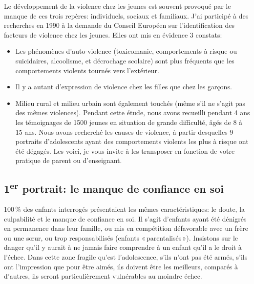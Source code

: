 \documentclass[11pt]{article} %
\begin{document}
  Le développement de la violence chez les jeunes est souvent provoqué par le manque de ces trois repères: individuels, sociaux et familiaux.\newline
  J'ai participé à des recherches en 1990 à la demande du Conseil Européen sur l'identification des facteurs de violence chez les jeunes. Elles ont mis en évidence 3 constats:
  \begin{itemize}[--]

    \item Les phénomènes d'auto-violence (toxicomanie, comportements à risque ou suicidaires, alcoolisme, et décrochage scolaire) sont plus fréquents que les comportements violents tournés vers l'extérieur.

    \item Il y a autant d'expression de violence chez les filles que chez les garçons.

    \item Milieu rural et milieu urbain sont également touchés (même s'il ne s'agit pas des mêmes violences). Pendant cette étude, nous avons recueilli pendant 4 ans les témoignages de 1500 jeunes en situation de grande difficulté, âgés de 8 à 15 ans. Nous avons recherché les causes de violence, à partir desquelles 9 portraits d'adolescents ayant des comportements violents les plus à risque ont été dégagés. Les voici, je vous invite à les transposer en fonction de votre pratique de parent ou d'enseignant.
  \end{itemize}

\subsection{1\textsuperscript{er} portrait: le manque de confiance en soi }

  100\,\% des enfants interrogés présentaient les mêmes caractéristiques: le doute, la culpabilité et le manque de confiance en soi. Il s'agit d'enfants ayant été dénigrés en permanence dans leur famille, ou mis en compétition défavorable avec un frère ou une sœur, ou trop responsabilisés (enfants « parentalisés »).\newline
  Insistons sur le danger qu'il y aurait à ne jamais faire comprendre à un enfant qu'il a le droit à l'échec. Dans cette zone fragile qu'est l'adolescence, s'ils n'ont pas été armés, s'ils ont l'impression que pour être aimés, ils doivent être les meilleurs, comparés à d'autres, ils seront particulièrement vulnérables au moindre échec.
\end{document}
